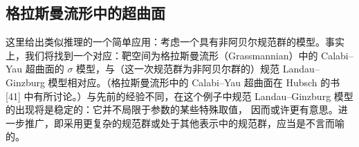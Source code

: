 

\subsection{格拉斯曼流形中的超曲面}

这里给出类似推理的一个简单应用：考虑一个具有非阿贝尔规范群的模型。事实上，我们将找到一个对应：靶空间为格拉斯曼流形（Grassmannian）中的 Calabi--Yau 超曲面的 $\sigma$ 模型，与（这一次规范群为非阿贝尔群的）规范 Landau--Ginzburg 模型相对应。（格拉斯曼流形中的 Calabi--Yau 超曲面在 Hubsch 的书 [41] 中有所讨论。）与先前的经验不同，在这个例子中规范 Landau--Ginzburg 模型的出现将是稳定的：它并不局限于参数的某些特殊取值，%
\label{op:59}
因而或许更有意思。进一步推广，即采用更复杂的规范群或处于其他表示中的规范群，应当是不言而喻的。


